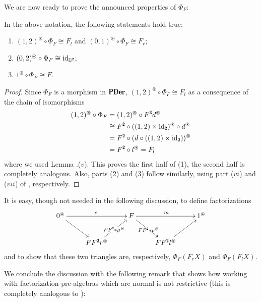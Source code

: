 We are now ready to prove the announced properties of $\Phi_F$:
\begin{lemma}\label{prealgebra_induces_factorization}
In the above notation, the following statements hold true:
\begin{enumerate}
\item $(1,2)^\circledast \circ \Phi_F\cong F_l$ and $(0,1)^\circledast \circ\Phi_F\cong F_r$;
\item $(0,2)^\circledast \circ \Phi_F\cong \id_{\D^\due}$;
\item $1^\circledast \circ \Phi_F \cong F$.
\end{enumerate}
\end{lemma}
\begin{proof}
Since $\Phi_F$ is a morphism in $\PDer$, $(1,2)^\circledast\circ \Phi_F \cong F_l$ as a consequence of the chain of isomorphisms
\begin{align*}
(1,2)^\circledast\circ \Phi_F & =(1,2)^\circledast\circ F^\tre d^\circledast\\
& \cong F^\due \circ ((1,2)\times \id_\due)^\circledast \circ d^\circledast\\
&=F^\due \circ (d \circ((1,2)\times \id_\due))^\circledast\\
&=F^\due \circ l^\circledast=F_l
\end{align*}
where we used Lemma .($v$). This proves the first half of (1), the second half is completely analogous. Also, parts (2) and (3) follow similarly, using part ($vi$) and ($vii$) of , respectively.
\end{proof}
\begin{remark}
It is easy, though not needed in the following discussion, to define factorizations 
\[
\xymatrix{
	0^\circledast \ar[dr]\ar[rr]^e&& F\ar[rr]^m \ar[dr]|{FF^\due* \nu^\circledast}&& 1^\circledast \\
	& FF^\due r^\circledast \ar[ur]|{FF^\due * \mu^\circledast}&& FF^\due l^\circledast\ar[ur]
}
\]
and to show that these two triangles are, respectively, $\Phi_F(F_rX)$ and $\Phi_F(F_lX)$.
\end{remark}
We conclude the discussion with the following remark that shows how working with factorization pre\hyp{}algebras which are normal is not restrictive (this is completely analogous to \cite[§\textbf{2.2}]{Korostenski199357}):
